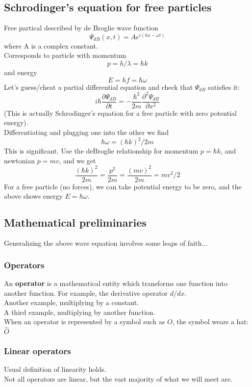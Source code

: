 \documentclass{article}
\begin{document}
\subsection{Schrodinger's equation for free particles}
Free partical described by de Broglie wave function
$$ \Psi_{dB}(x,t) = A e^{i(kx-\omega t)} $$
where A is a complex constant.\\
Corresponds to particle with momentum
$$ p = h/\lambda = \hbar k $$
and energy
$$ E = hf = \hbar \omega $$
Let's guess/cheat a partial differential equation and check that $\Psi_{dB}$ satisfies it:
$$ i \hbar \frac{\partial \Psi_{dB}}
                {\partial t}         = -\frac{\hbar^2}
                                             {2m}       \frac{\partial^2\Psi_{dB}}
                                                             {\partial x^2} $$
(This is actually Schrodinger's equation for a free particle with zero potential energy).\\
Differentiating and plugging one into the other we find
$$ \hbar\omega =(\hbar k)^2/2m $$
This is significant. Use the deBroglie relationship for momentum $p=\hbar k$, and newtonian $p=mv$, and we get
$$ \frac{(\hbar k)^2}
        {2m}          = \frac{p^2}
                             {2m}   = \frac{(mv)^2}
                                           {2m}     = mv^2/2 $$
For a free particle (no forces), we can take potential energy to be zero, and the above shows energy $E=\hbar\omega$.

\subsection{Mathematical preliminaries}
Generalizing the above wave equation involves some leaps of faith...

\subsubsection{Operators}
An \textbf{operator} is a mathematical entity which transforms one function into another function.
For example, the derivative operator $d/dx$.\\
Another example, multiplying by a constant.\\
A third example, multiplying by another function.\\
When an operator is represented by a symbol such as $O$, the symbol wears a hat: $\hat{O}$\\

\subsubsection{Linear operators}
Usual definition of linearity holds.\\
Not all operators are linear, but the vast majority of what we will meet are.\\
\end{document}
